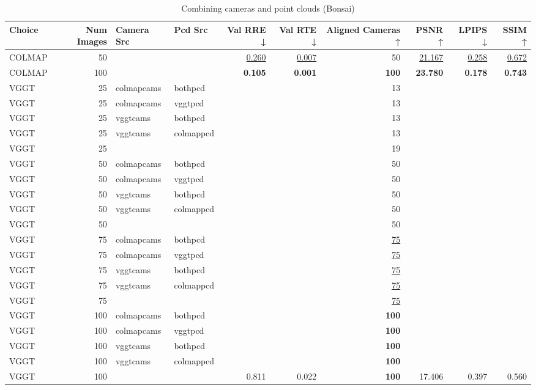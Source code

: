 \begin{table}[H]
\caption{Combining cameras and point clouds (Bonsai)}
\label{tab:07_combined_bonsai}
\begin{tabular}{lrllrrrrrr}
\toprule
Choice & Num Images & Camera Src & Pcd Src & Val RRE ↓ & Val RTE ↓ & Aligned Cameras ↑ & PSNR ↑ & LPIPS ↓ & SSIM ↑ \\
\midrule
COLMAP & 50 &  &  & \underline{0.260} & \underline{0.007} & 50 & \underline{21.167} & \underline{0.258} & \underline{0.672} \\
COLMAP & 100 &  &  & \textbf{0.105} & \textbf{0.001} & \textbf{100} & \textbf{23.780} & \textbf{0.178} & \textbf{0.743} \\
VGGT & 25 & colmapcams & bothpcd &  &  & 13 &  &  &  \\
VGGT & 25 & colmapcams & vggtpcd &  &  & 13 &  &  &  \\
VGGT & 25 & vggtcams & bothpcd &  &  & 13 &  &  &  \\
VGGT & 25 & vggtcams & colmappcd &  &  & 13 &  &  &  \\
VGGT & 25 &  &  &  &  & 19 &  &  &  \\
VGGT & 50 & colmapcams & bothpcd &  &  & 50 &  &  &  \\
VGGT & 50 & colmapcams & vggtpcd &  &  & 50 &  &  &  \\
VGGT & 50 & vggtcams & bothpcd &  &  & 50 &  &  &  \\
VGGT & 50 & vggtcams & colmappcd &  &  & 50 &  &  &  \\
VGGT & 50 &  &  &  &  & 50 &  &  &  \\
VGGT & 75 & colmapcams & bothpcd &  &  & \underline{75} &  &  &  \\
VGGT & 75 & colmapcams & vggtpcd &  &  & \underline{75} &  &  &  \\
VGGT & 75 & vggtcams & bothpcd &  &  & \underline{75} &  &  &  \\
VGGT & 75 & vggtcams & colmappcd &  &  & \underline{75} &  &  &  \\
VGGT & 75 &  &  &  &  & \underline{75} &  &  &  \\
VGGT & 100 & colmapcams & bothpcd &  &  & \textbf{100} &  &  &  \\
VGGT & 100 & colmapcams & vggtpcd &  &  & \textbf{100} &  &  &  \\
VGGT & 100 & vggtcams & bothpcd &  &  & \textbf{100} &  &  &  \\
VGGT & 100 & vggtcams & colmappcd &  &  & \textbf{100} &  &  &  \\
VGGT & 100 &  &  & 0.811 & 0.022 & \textbf{100} & 17.406 & 0.397 & 0.560 \\
\bottomrule
\end{tabular}
\end{table}

